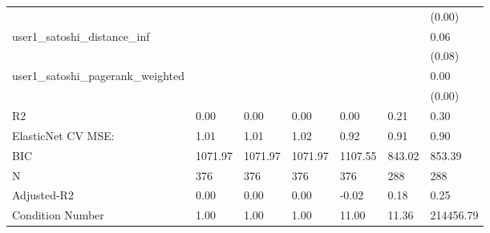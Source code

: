 \begin{table}
\begin{center}
\begin{tabular}{lllllll}
                                               &          &         &         &         &          & (0.00)     \\
user1_satoshi_distance_inf                     &          &         &         &         &          & 0.06       \\
                                               &          &         &         &         &          & (0.08)     \\
user1_satoshi_pagerank_weighted                &          &         &         &         &          & 0.00       \\
                                               &          &         &         &         &          & (0.00)     \\
R2                                             & 0.00     & 0.00    & 0.00    & 0.00    & 0.21     & 0.30       \\
ElasticNet CV MSE:                             & 1.01     & 1.01    & 1.02    & 0.92    & 0.91     & 0.90       \\
BIC                                            & 1071.97  & 1071.97 & 1071.97 & 1107.55 & 843.02   & 853.39     \\
N                                              & 376      & 376     & 376     & 376     & 288      & 288        \\
Adjusted-R2                                    & 0.00     & 0.00    & 0.00    & -0.02   & 0.18     & 0.25       \\
Condition Number                               & 1.00     & 1.00    & 1.00    & 11.00   & 11.36    & 214456.79  \\
\hline
\end{tabular}
\end{center}
\end{table}
